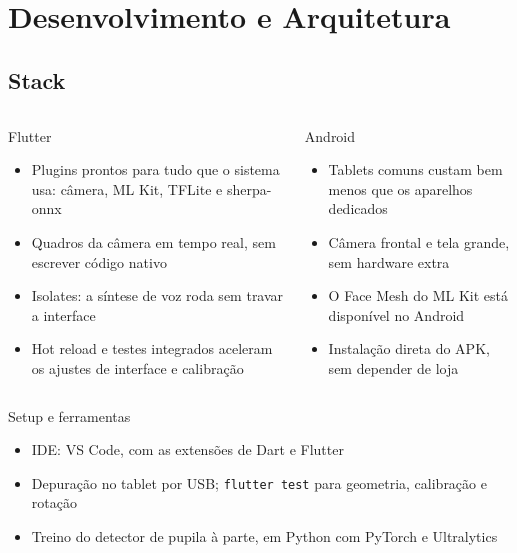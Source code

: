 \documentclass{UnBeamer}
\begin{document}
\section{Desenvolvimento e Arquitetura}

\subsection{Stack}
\begin{frame}
    \scriptsize
    \begin{columns}[T]
            \begin{block}{Flutter~\cite{flutter}}
                \begin{itemize}
                    \item Plugins prontos para tudo que o sistema usa:
                          câmera, ML Kit, TFLite e sherpa-onnx
                    \item Quadros da câmera em tempo real, sem escrever
                          código nativo
                    \item Isolates: a síntese de voz roda sem travar a
                          interface
                    \item Hot reload e testes integrados aceleram os
                          ajustes de interface e calibração
                \end{itemize}
            \end{block}
            \begin{block}{Android}
                \begin{itemize}
                    \item Tablets comuns custam bem menos que os aparelhos
                          dedicados
                    \item Câmera frontal e tela grande, sem hardware extra
                    \item O Face Mesh do ML Kit está disponível no Android
                    \item Instalação direta do APK, sem depender de loja
                \end{itemize}
            \end{block}
    \end{columns}
    \vspace{2ex}
    \begin{exampleblock}{Setup e ferramentas}
        \begin{itemize}
            \item IDE: VS Code, com as extensões de Dart e Flutter
            \item Depuração no tablet por USB; \texttt{flutter test} para
                  geometria, calibração e rotação
            \item Treino do detector de pupila à parte, em Python com
                  PyTorch e Ultralytics
        \end{itemize}
    \end{exampleblock}
\end{frame}
\end{document}
